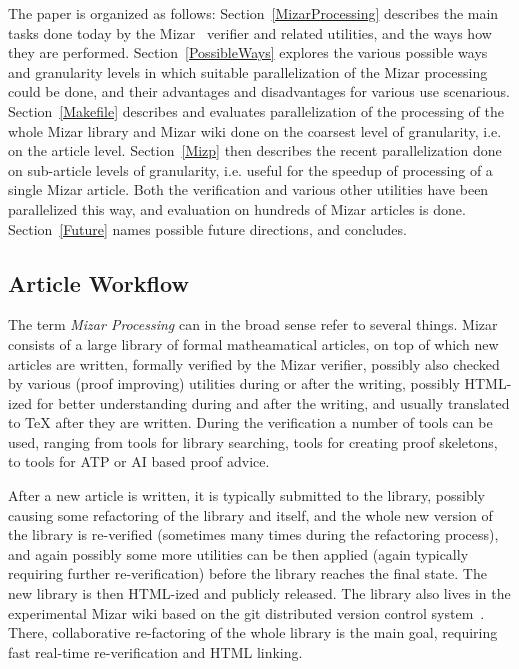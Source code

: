 \documentclass{llncs}
\makeatletter
\renewcommand\section{\@startsection{section}{1}{\z@}{-12\p@ \@plus -4\p@ \@minus -4\p@}{8\p@ \@plus 4\p@ \@minus 4\p@}{\normalfont\large\bfseries\boldmath
                        \rightskip=\z@ \@plus 8em\pretolerance=10000 }}
\makeatother
\begin{document}
The paper is organized as follows: Section~\ref{MizarProcessing}
describes the main tasks done today by the
Mizar~\cite{mizar-in-a-nutshell,RudnickiT99} verifier and related utilities,
and the ways how they are performed.  Section~\ref{PossibleWays}
explores the various possible ways and granularity levels in which
suitable parallelization of the Mizar processing could be done, and
their advantages and disadvantages for various use scenarious.
Section~\ref{Makefile} describes and evaluates 
parallelization of the processing of the whole Mizar library and Mizar wiki
done on the coarsest level of granularity, i.e. on the article level.
Section~\ref{Mizp} then describes the recent parallelization done on
sub-article levels of granularity, i.e. useful for the speedup of
processing of a single Mizar article. Both the verification and
various other utilities have been parallelized this way, and
evaluation on hundreds of Mizar articles is done.  Section~\ref{Future}
names possible future directions, and concludes.

\section{Mizar Processing}
\label{MizarProcessing}
\subsection{Article Workflow}
The term \emph{Mizar Processing} can in the broad sense refer to
several things.  Mizar consists of a large library of formal
matheamatical articles, on top of which new articles are written,
formally verified by the Mizar verifier, possibly also checked by
various (proof improving) utilities during or after the writing,
possibly HTML-ized for better understanding during and after the
writing, and usually translated to TeX after they are written. During
the verification a number of tools can be used, ranging from tools for
library searching, tools for creating proof skeletons, to tools for
ATP or AI based proof advice.

After a new article is written, it is typically submitted to the
library, possibly causing some refactoring of the library and itself,
and the whole new version of the library is re-verified (sometimes
many times during the refactoring process), and again possibly some
more utilities can be then applied (again typically requiring further
re-verification) before the library reaches the final state. The new
library is then HTML-ized and publicly released. The library also lives
in the experimental Mizar wiki based on the git distributed version
control system~\cite{UrbanARG10,AlamaBMU11}. There, collaborative re-factoring of
the whole library is the main goal, requiring fast real-time
re-verification and HTML linking.
\end{document}

